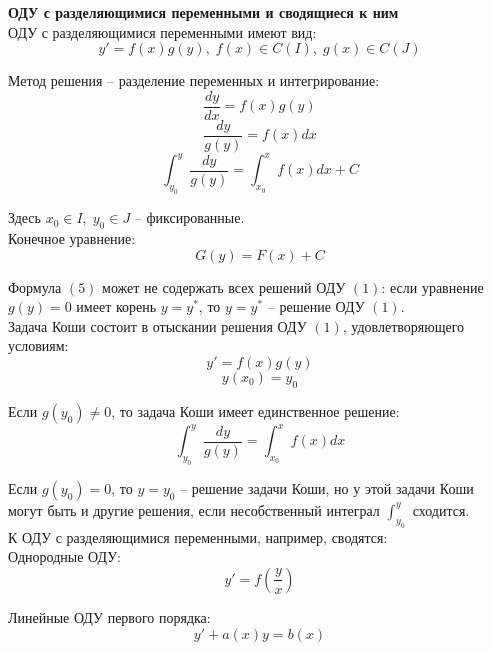 \documentclass{article}
\begin{document}
	
	\textbf{ОДУ с разделяющимися переменными и сводящиеся к ним}\\

	ОДУ с разделяющимися переменными имеют вид:
	\begin{equation}
		y' = f(x)g(y),\;f(x)\in C(I),\;g(x)\in C(J)
	\end{equation}

	Метод решения -- разделение переменных и интегрирование:
	\begin{equation}
		\frac{dy}{dx} = f(x)g(y)
	\end{equation}
	\begin{equation}
		\frac{dy}{g(y)} = f(x)dx
	\end{equation}
	\begin{equation}
		\int_{y_0}^y \frac{dy}{g(y)} = \int_{x_0}^x f(x)dx + C
	\end{equation}

	Здесь $x_0\in I,\;y_0\in J$ -- фиксированные.\\

	Конечное уравнение:
	\begin{equation}
		G(y) = F(x) + C
	\end{equation}

	Формула $(5)$ может не содержать всех решений ОДУ $(1)$: если уравнение $g(y)=0$ имеет корень $y=y^*$, то $y=y^*$ -- решение ОДУ $(1)$.\\

	Задача Коши состоит в отыскании решения ОДУ $(1)$, удовлетворяющего условиям:
	\begin{equation}
		y' = f(x)g(y)
	\end{equation}
	\begin{equation}
		y(x_0) = y_0
	\end{equation}

	Если $g(y_0)\neq 0$, то задача Коши имеет единственное решение:
	\begin{equation}
		\int_{y_0}^y \frac{dy}{g(y)} = \int_{x_0}^x f(x)dx
	\end{equation}

	Если $g(y_0)=0$, то $y = y_0$ -- решение задачи Коши, но у этой задачи Коши могут быть и другие решения, если несобственный интеграл $\int_{y_0}^y$ сходится.\\

	К ОДУ с разделяющимися переменными, например, сводятся:\\

	Однородные ОДУ:
	\begin{equation}
		y' = f(\frac{y}{x})
	\end{equation}

	Линейные ОДУ первого порядка:
	\begin{equation}
		y' + a(x)y = b(x)
	\end{equation}
\end{document}
